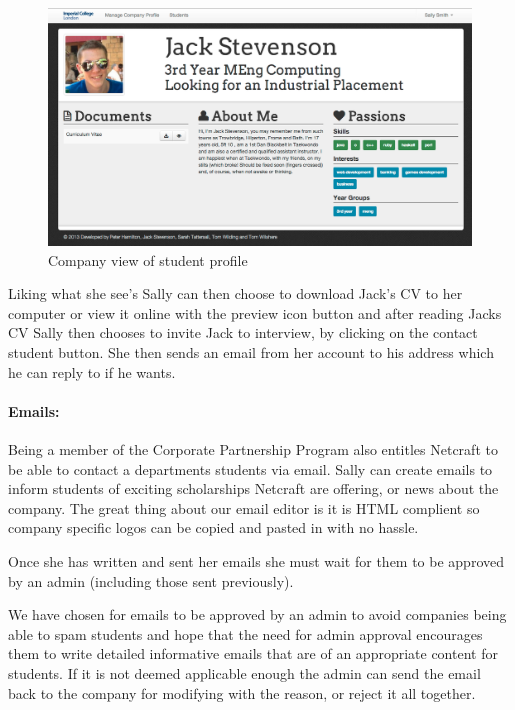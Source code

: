     \begin{figure}[H]\centering
    \includegraphics[scale=0.3]{images/user_experiences/company/jack_profile}
    \caption{Company view of student profile}
    \end{figure}

    Liking what she see's Sally can then choose to download Jack's CV to her computer or view it online with the preview icon button and after reading Jacks CV Sally then chooses to invite Jack to interview, by clicking on the contact student button. She then sends an email from her account to his address which he can reply to if he wants. 

  \paragraph{Emails:}
    Being a member of the Corporate Partnership Program also entitles Netcraft to be able to contact a departments students via email. Sally can create emails to inform students of exciting scholarships Netcraft are offering, or news about the company. The great thing about our email editor is it is HTML complient so company specific logos can be copied and pasted in with no hassle.

    Once she has written and sent her emails she must wait for them to be approved by an admin (including those sent previously).

    We have chosen for emails to be approved by an admin to avoid companies being able to spam students and hope that the need for admin approval encourages them to write detailed informative emails that are of an appropriate content for students. If it is not deemed applicable enough the admin can send the email back to the company for modifying with the reason, or reject it all together.

